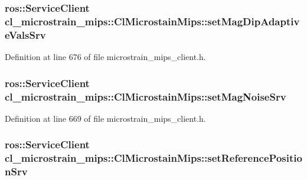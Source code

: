 \subsubsection[{\texorpdfstring{set\+Mag\+Dip\+Adaptive\+Vals\+Srv}{setMagDipAdaptiveValsSrv}}]{\setlength{\rightskip}{0pt plus 5cm}ros\+::\+Service\+Client cl\+\_\+microstrain\+\_\+mips\+::\+Cl\+Microstain\+Mips\+::set\+Mag\+Dip\+Adaptive\+Vals\+Srv\hspace{0.3cm}{\ttfamily [protected]}}\hypertarget{classcl__microstrain__mips_1_1ClMicrostainMips_a3618b27ce1ed75f2e498c0bc6a36599d}{}\label{classcl__microstrain__mips_1_1ClMicrostainMips_a3618b27ce1ed75f2e498c0bc6a36599d}


Definition at line 676 of file microstrain\+\_\+mips\+\_\+client.\+h.

\subsubsection[{\texorpdfstring{set\+Mag\+Noise\+Srv}{setMagNoiseSrv}}]{\setlength{\rightskip}{0pt plus 5cm}ros\+::\+Service\+Client cl\+\_\+microstrain\+\_\+mips\+::\+Cl\+Microstain\+Mips\+::set\+Mag\+Noise\+Srv\hspace{0.3cm}{\ttfamily [protected]}}\hypertarget{classcl__microstrain__mips_1_1ClMicrostainMips_a0a6ed1132b9cca45536598e78c8b23cc}{}\label{classcl__microstrain__mips_1_1ClMicrostainMips_a0a6ed1132b9cca45536598e78c8b23cc}


Definition at line 669 of file microstrain\+\_\+mips\+\_\+client.\+h.

\subsubsection[{\texorpdfstring{set\+Reference\+Position\+Srv}{setReferencePositionSrv}}]{\setlength{\rightskip}{0pt plus 5cm}ros\+::\+Service\+Client cl\+\_\+microstrain\+\_\+mips\+::\+Cl\+Microstain\+Mips\+::set\+Reference\+Position\+Srv\hspace{0.3cm}{\ttfamily [protected]}}\hypertarget{classcl__microstrain__mips_1_1ClMicrostainMips_a778117029f93a6cff9c5e2a0dac9742b}{}\label{classcl__microstrain__mips_1_1ClMicrostainMips_a778117029f93a6cff9c5e2a0dac9742b}



